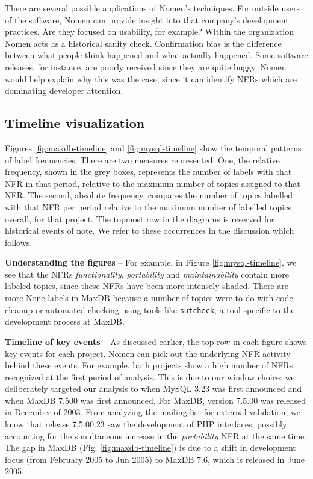 \documentclass[]{sig-alternate}
\begin{document}
There are several possible applications of \textsf{Nomen}'s techniques. 
For outside users of the software, \textsf{Nomen} can provide insight into that company's development practices. 
Are they focused on usability, for example?
Within the organization \textsf{Nomen} acts as a historical sanity check. 
Confirmation bias is the difference between what people think happened and what actually happened. 
Some software releases, for instance, are poorly received since they are quite buggy. 
\textsf{Nomen} would help explain why this was the case, since it can identify NFRs which are dominating developer attention.

\subsection{Timeline visualization}
Figures \ref{fig:maxdb-timeline} and \ref{fig:mysql-timeline} show the temporal patterns of label frequencies. 
There are two measures represented. 
One, the relative frequency, shown in the grey boxes, represents the number of labels with that NFR in that period, 
relative to the maximum number of topics assigned to that NFR. 
The second, absolute frequency, compares the number of topics labelled with that NFR per period 
relative to the maximum number of labelled topics overall, for that project. The topmost row in the diagrams is reserved for historical events of note. We refer to these occurrences in the discussion which follows.

\textbf{Understanding the figures} -- For example, in Figure \ref{fig:mysql-timeline}, we see that the NFRs \emph{functionality}, \emph{portability} and \emph{maintainability} contain more labeled topics, since these NFRs have been more intensely shaded. %
There are more \textsf{None} labels in MaxDB because a number of topics were to do with code cleanup or automated checking using tools like \texttt{sutcheck}, a tool-specific to the development process at MaxDB. 

\textbf{Timeline of key events} -- As discussed earlier, the top row in each figure shows key events for each project. \textsf{Nomen} can pick out the underlying NFR activity behind these events. For example, both projects show a high number of NFRs recognized at the first period of analysis. 
This is due to our window choice: we deliberately targeted our analysis to when MySQL 3.23 was first announced %
and when MaxDB 7.500 was first announced. For MaxDB, version 7.5.00  was released in December of 2003. 
From analyzing the mailing list for external validation, we know that release 7.5.00.23 saw the development of PHP interfaces, possibly accounting for the simultaneous increase in the \emph{portability} NFR at the same time.
The gap in MaxDB (Fig. \ref{fig:maxdb-timeline}) is due to a shift in development focus (from February 2005 to Jun 2005) to MaxDB 7.6, which is released in June 2005.
\end{document}
